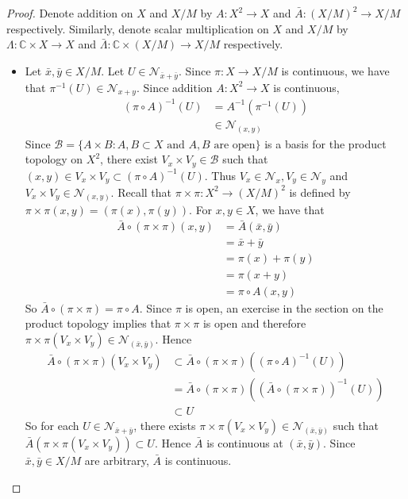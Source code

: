 \documentclass[12pt]{amsart}
\theoremstyle{definition}
\newcommand{\Lam}{\Lambda}
\newcommand{\C}{\mathbb{C}}
\newcommand{\MB}{\mathcal{B}}
\newcommand{\MN}{\mathcal{N}}
\DeclareMathOperator*{\0}{\mbf{0}}
\DeclareMathOperator*{\1}{\mbf{1}}
\begin{document}
	\begin{proof}
		Denote addition on $X$ and $X /M$ by $A: X^2 \rightarrow X$ and $\bar{A}:(X /M)^2 \rightarrow X/ M$ respectively. Similarly, denote scalar multiplication on $X$ and $X /M$ by $\Lam: \C \times X \rightarrow X$ and $\bar{\Lam}:\C \times (X /M) \rightarrow X/ M$ respectively. 
		\begin{itemize}
			\item Let $\bar{x}, \bar{y} \in X /M$. Let $U \in \MN_{\bar{x} + \bar{y}}$. Since $\pi: X \rightarrow X / M$ is continuous, we have that $\pi^{-1}(U) \in \MN_{x+y}$. Since addition $A: X^2 \rightarrow X$ is continuous,
			\begin{align*}
				(\pi \circ A)^{-1}(U) 
				& = A^{-1}(\pi^{-1}(U)) \\
				&\in \MN_{(x,y)}
			\end{align*}
			Since $\MB = \{A \times B: A,B \subset X \text{ and $A,B$ are open}\}$ is a basis for the product topology on $X^2$, there exist $V_x \times V_y \in \MB$ such that $(x,y) \in V_x \times V_y \subset (\pi \circ A)^{-1}(U)$. Thus $V_x \in \MN_x, V_y \in \MN_y$ and $V_x \times V_y \in \MN_{(x,y)}$. Recall that $\pi \times \pi: X^2 \rightarrow (X /M)^2$ is defined by $\pi \times \pi (x,y) = (\pi(x), \pi(y))$. For $x,y \in X$, we have that 
			\begin{align*}
				\bar{A}\circ (\pi \times \pi)(x,y)
				& = \bar{A}(\bar{x}, \bar{y}) \\
				& = \bar{x} + \bar{y} \\
				&= \pi(x) + \pi(y) \\
				&= \pi (x + y) \\
				&= \pi \circ A (x,y) 
			\end{align*}
			So $\bar{A}\circ (\pi \times \pi) = \pi \circ A$.  Since $\pi$ is open, an exercise in the section on the product topology implies that $\pi \times \pi$ is open and therefore $\pi \times \pi(V_x \times V_y) \in \MN_{(\bar{x}, \bar{y})}$. Hence
			\begin{align*}
				\bar{A} \circ (\pi \times \pi) (V_x \times V_y) 
				& \subset \bar{A} \circ (\pi \times \pi)((\pi \circ A)^{-1}(U)) \\
				& = \bar{A} \circ (\pi \times \pi)((\bar{A} \circ (\pi \times \pi))^{-1}(U)) \\
				& \subset U
			\end{align*} 
			So for each $U \in \MN_{\bar{x} + \bar{y}}$, there exists $\pi \times \pi(V_x \times V_y) \in \MN_{(\bar{x}, \bar{y})}$ such that $\bar{A}(\pi \times \pi(V_x \times V_y)) \subset U$. Hence $\bar{A}$ is continuous at $(\bar{x}, \bar{y})$. Since $\bar{x}, \bar{y} \in X/ M$ are arbitrary, $\bar{A}$ is continuous. 

\end{itemize}
\end{proof}
\end{document}
